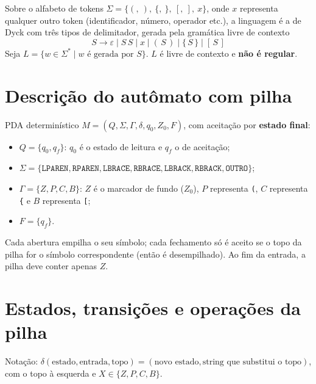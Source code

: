 \documentclass[12pt,a4paper]{article}
\begin{document}
Sobre o alfabeto de tokens $\Sigma = \{(,\ ),\ \{,\ \},\ [,\ ],\ x\}$, onde $x$ representa qualquer outro token (identificador, número, operador etc.), a linguagem é a de Dyck com três tipos de delimitador, gerada pela gramática livre de contexto
\[
S \rightarrow \varepsilon \mid S\,S \mid x \mid (\,S\,) \mid \{\,S\,\} \mid [\,S\,]
\]
Seja $L = \{w \in \Sigma^* \mid w \text{ é gerada por } S\}$. $L$ é livre de contexto e \textbf{não é regular}.

\section{Descrição do autômato com pilha}

PDA determinístico $M = (Q, \Sigma, \Gamma, \delta, q_0, Z_0, F)$, com aceitação por \textbf{estado final}:
\begin{itemize}
  \item $Q = \{q_0, q_f\}$: $q_0$ é o estado de leitura e $q_f$ o de aceitação;
  \item $\Sigma = \{\texttt{LPAREN}, \texttt{RPAREN}, \texttt{LBRACE}, \texttt{RBRACE}, \texttt{LBRACK}, \texttt{RBRACK}, \texttt{OUTRO}\}$;
  \item $\Gamma = \{Z, P, C, B\}$: $Z$ é o marcador de fundo ($Z_0$), $P$ representa \texttt{(}, $C$ representa \texttt{\{} e $B$ representa \texttt{[};
  \item $F = \{q_f\}$.
\end{itemize}
Cada abertura empilha o seu símbolo; cada fechamento só é aceito se o topo da pilha for o símbolo correspondente (então é desempilhado). Ao fim da entrada, a pilha deve conter apenas $Z$.

\section{Estados, transições e operações da pilha}

Notação: $\delta(\text{estado}, \text{entrada}, \text{topo}) = (\text{novo estado}, \text{string que substitui o topo})$, com o topo à esquerda e $X \in \{Z, P, C, B\}$.
\end{document}
